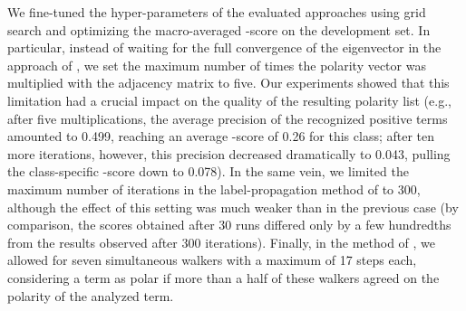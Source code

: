 We fine-tuned the hyper-parameters of the evaluated approaches using
grid search and optimizing the macro-averaged \F{}-score on the
development set.  In particular, instead of waiting for the full
convergence of the eigenvector in the approach of
\citet{Blair-Goldensohn:08}, we set the maximum number of times the
polarity vector was multiplied with the adjacency matrix to five.  Our
experiments showed that this limitation had a crucial impact on the
quality of the resulting polarity list (e.g., after five
multiplications, the average precision of the recognized positive
terms amounted to 0.499, reaching an average \F{}-score of 0.26 for
this class; after ten more iterations, however, this precision
decreased dramatically to 0.043, pulling the class-specific \F{}-score
down to 0.078).  In the same vein, we limited the maximum number of
iterations in the label-propagation method of \citet{Rao:09} to 300,
although the effect of this setting was much weaker than in the
previous case (by comparison, the scores obtained after 30 runs
differed only by a few hundredths from the results observed after 300
iterations).  Finally, in the method of \citet{Awadallah:10}, we
allowed for seven simultaneous walkers with a maximum of 17 steps
each, considering a term as polar if more than a half of these walkers
agreed on the polarity of the analyzed term.

